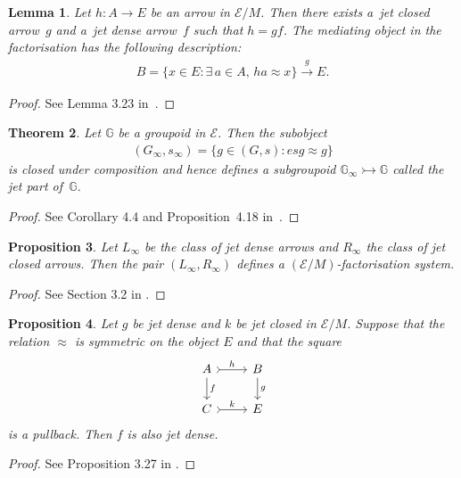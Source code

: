 \documentclass[10pt,a4paper]{amsart}
\numberwithin{equation}{section}
\newtheorem{Theorem}{Theorem}[section]
\newtheorem{Lemma}[Theorem]{Lemma}
\newtheorem{Proposition}[Theorem]{Proposition}
{ \theoremstyle{definition}
\newtheorem{Definition}[Theorem]{Definition}
\newtheorem{Notation}[Theorem]{Notation}
\newtheorem{Example}[Theorem]{Example}
\newtheorem{Remark}[Theorem]{Remark} }
\begin{document}
\begin{Lemma}\label{lem:existence-of-w-factorisations}Let $h\colon A\rightarrow E$ be an arrow in $\mathcal{E}/M$. Then there exists a~jet closed arrow~$g$ and a~jet dense arrow~$f$ such that $h=gf$. The mediating object in the factorisation has the following description:
\begin{gather*}B=\{x\in E\colon \exists\, a\in A,\, ha\approx x\}\xrightarrow{g} E.\end{gather*}
\end{Lemma}
\begin{proof}See Lemma 3.23 in~\cite{burke-relative-to-local-models}.
\end{proof}

\begin{Theorem}
Let $\mathbb{G}$ be a groupoid in $\mathcal{E}$. Then the subobject
 \begin{gather*}(G_{\infty},s_{\infty})=\{g\in (G,s)\colon esg\approx g\}\end{gather*}
is closed under composition and hence defines a subgroupoid $\mathbb{G}_{\infty} \rightarrowtail \mathbb{G}$ called the \emph{jet part of~$\mathbb{G}$}.
\end{Theorem}
 \begin{proof}
 See Corollary 4.4 and Proposition~4.18 in~\cite{burke-relative-to-local-models}.
 \end{proof}

\begin{Proposition}Let $L_{\infty}$ be the class of jet dense arrows and $R_{\infty}$ the class of jet closed arrows. Then the pair $(L_{\infty},R_{\infty})$ defines a $(\mathcal{E}/M)$-factorisation system.
\end{Proposition}
 \begin{proof}See Section 3.2 in \cite{burke-relative-to-local-models}.
 \end{proof}

\begin{Proposition}\label{proposition:dense-stable-along-closed-when-symmetric}
Let $g$ be jet dense and $k$ be jet closed in ${\mathcal E}/M$. Suppose that the relation $\approx$ is symmetric on the object $E$ and that the square
\begin{equation*}\begin{tikzcd}
A \dar{f} \rar[rightarrowtail]{h} & B \dar{g} \\
C \rar[rightarrowtail]{k} & E
\end{tikzcd}\end{equation*}
is a pullback. Then $f$ is also jet dense.
\end{Proposition}
\begin{proof}
 See Proposition 3.27 in \cite{burke-relative-to-local-models}.
\end{proof}
\end{document}
